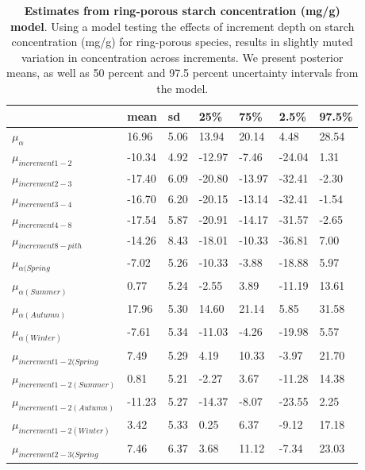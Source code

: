 \documentclass{article}\usepackage[]{graphicx}\usepackage[]{color}
\begin{document}
\begin{table}[ht]
\centering
\caption{\textbf{Estimates from ring-porous starch concentration (mg/g) model}. Using a model testing the effects of increment depth on starch concentration (mg/g) for ring-porous species, results in slightly muted variation in concentration across increments. We present posterior means, as well as 50 percent and 97.5 percent uncertainty intervals from the model.} 
\label{tab:ringstar}
\begingroup\footnotesize
\begin{tabular}{|p{}|p{}|p{}|p{}|p{}|p{}|p{}|}
  \hline
 & mean & sd & 25\% & 75\% & 2.5\% & 97.5\% \\ 
  \hline
$\mu_{\alpha}$ & 16.96 & 5.06 & 13.94 & 20.14 & 4.48 & 28.54 \\ 
  $\mu_{increment 1-2}$ & -10.34 & 4.92 & -12.97 & -7.46 & -24.04 & 1.31 \\ 
  $\mu_{increment 2-3}$ & -17.40 & 6.09 & -20.80 & -13.97 & -32.41 & -2.30 \\ 
  $\mu_{increment 3-4}$ & -16.70 & 6.20 & -20.15 & -13.14 & -32.41 & -1.54 \\ 
  $\mu_{increment 4-8}$ & -17.54 & 5.87 & -20.91 & -14.17 & -31.57 & -2.65 \\ 
  $\mu_{increment 8-pith}$ & -14.26 & 8.43 & -18.01 & -10.33 & -36.81 & 7.00 \\ 
  $\mu_{\alpha (Spring}$ & -7.02 & 5.26 & -10.33 & -3.88 & -18.88 & 5.97 \\ 
  $\mu_{\alpha (Summer)}$ & 0.77 & 5.24 & -2.55 & 3.89 & -11.19 & 13.61 \\ 
  $\mu_{\alpha (Autumn)}$ & 17.96 & 5.30 & 14.60 & 21.14 & 5.85 & 31.58 \\ 
  $\mu_{\alpha (Winter)}$ & -7.61 & 5.34 & -11.03 & -4.26 & -19.98 & 5.57 \\ 
  $\mu_{increment 1-2 (Spring}$ & 7.49 & 5.29 & 4.19 & 10.33 & -3.97 & 21.70 \\ 
  $\mu_{increment 1-2 (Summer)}$ & 0.81 & 5.21 & -2.27 & 3.67 & -11.28 & 14.38 \\ 
  $\mu_{increment 1-2 (Autumn)}$ & -11.23 & 5.27 & -14.37 & -8.07 & -23.55 & 2.25 \\ 
  $\mu_{increment 1-2 (Winter)}$ & 3.42 & 5.33 & 0.25 & 6.37 & -9.12 & 17.18 \\ 
  $\mu_{increment 2-3 (Spring}$ & 7.46 & 6.37 & 3.68 & 11.12 & -7.34 & 23.03 \\ 

\end{tabular}
\end{table}
\end{document}
